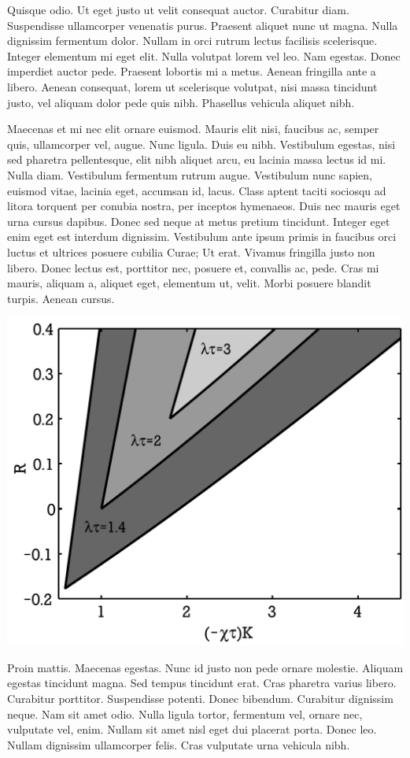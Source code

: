 \documentclass[c0paper, colorbacktitle, accentcolor=tud9c]{tudposter}
\begin{document}
\begin{multicols}{3}
    Quisque odio. Ut eget justo ut velit consequat auctor. Curabitur diam. Suspendisse ullamcorper venenatis purus. Praesent aliquet nunc ut magna. Nulla dignissim fermentum dolor. Nullam in orci rutrum lectus facilisis scelerisque. Integer elementum mi eget elit. Nulla volutpat lorem vel leo. Nam egestas. Donec imperdiet auctor pede. Praesent lobortis mi a metus. Aenean fringilla ante a libero. Aenean consequat, lorem ut scelerisque volutpat, nisi massa tincidunt justo, vel aliquam dolor pede quis nibh. Phasellus vehicula aliquet nibh.

    Maecenas et mi nec elit ornare euismod. Mauris elit nisi, faucibus ac, semper quis, ullamcorper vel, augue. Nunc ligula. Duis eu nibh. Vestibulum egestas, nisi sed pharetra pellentesque, elit nibh aliquet arcu, eu lacinia massa lectus id mi. Nulla diam. Vestibulum fermentum rutrum augue. Vestibulum nunc sapien, euismod vitae, lacinia eget, accumsan id, lacus. Class aptent taciti sociosqu ad litora torquent per conubia nostra, per inceptos hymenaeos. Duis nec mauris eget urna cursus dapibus. Donec sed neque at metus pretium tincidunt. Integer eget enim eget est interdum dignissim. Vestibulum ante ipsum primis in faucibus orci luctus et ultrices posuere cubilia Curae; Ut erat. Vivamus fringilla justo non libero. Donec lectus est, porttitor nec, posuere et, convallis ac, pede. Cras mi mauris, aliquam a, aliquet eget, elementum ut, velit. Morbi posuere blandit turpis. Aenean cursus.

    {\centering\includegraphics[clip,width=0.9\linewidth]{TUDposter-fig}}

    Proin mattis. Maecenas egestas. Nunc id justo non pede ornare molestie. Aliquam egestas tincidunt magna. Sed tempus tincidunt erat. Cras pharetra varius libero. Curabitur porttitor. Suspendisse potenti. Donec bibendum. Curabitur dignissim neque. Nam sit amet odio. Nulla ligula tortor, fermentum vel, ornare nec, vulputate vel, enim. Nullam sit amet nisl eget dui placerat porta. Donec leo. Nullam dignissim ullamcorper felis. Cras vulputate urna vehicula nibh.
    

\end{multicols}
\end{document}

